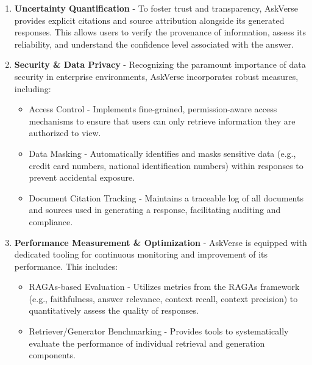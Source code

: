\documentclass[default]{sn-jnl}%
\begin{document}
\begin{enumerate}
\begin{itemize}
        \item Dense Retrieval - Utilizes advanced embedding (e.g., OpenAI embedding) to capture semantic similarity between queries and documents, enabling retrieval based on meaning rather than just keywords.
        \item Sparse Retrieval - Employs traditional keyword-based methods like BM25 for efficient and precise matching of exact terms.
        \item Ensemble Searches - Combines the results from both dense and sparse methods, often using re-ranking and fusion techniques, to achieve superior overall relevance and coverage.
    \end{itemize}
    \item \textbf{Uncertainty Quantification} - To foster trust and transparency, AskVerse provides explicit citations and source attribution alongside its generated responses. This allows users to verify the provenance of information, assess its reliability, and understand the confidence level associated with the answer.
    \item \textbf{Security \& Data Privacy} - Recognizing the paramount importance of data security in enterprise environments, AskVerse incorporates robust measures, including:
    \begin{itemize}
        \item Access Control - Implements fine-grained, permission-aware access mechanisms to ensure that users can only retrieve information they are authorized to view.
        \item Data Masking - Automatically identifies and masks sensitive data (e.g., credit card numbers, national identification numbers) within responses to prevent accidental exposure.
        \item Document Citation Tracking - Maintains a traceable log of all documents and sources used in generating a response, facilitating auditing and compliance.
    \end{itemize}
    \item \textbf{Performance Measurement \& Optimization} - AskVerse is equipped with dedicated tooling for continuous monitoring and improvement of its performance. This includes:
    \begin{itemize}
        \item RAGAs-based Evaluation - Utilizes metrics from the RAGAs framework (e.g., faithfulness, answer relevance, context recall, context precision) to quantitatively assess the quality of responses.
        \item Retriever/Generator Benchmarking - Provides tools to systematically evaluate the performance of individual retrieval and generation components.
    \end{itemize}
\end{enumerate}
\end{document}
